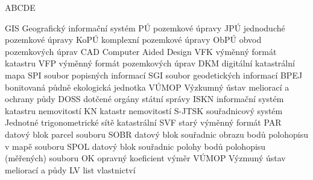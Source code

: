 
\begin{seznamzkratek}{ABCDE}

	      {GIS}
	      {Geografický informační systém}
	      {PÚ}
	      {pozemkové úpravy}
	      {JPÚ}
	      {jednoduché pozemkové úpravy}
	      {KoPÚ}
	      {komplexní pozemkové úpravy}
	      {ObPÚ}
	      {obvod pozemkových úprav}
	      {CAD}
	      {Computer Aided Design}
	      {VFK}
	      {výměnný formát katastru}
	      {VFP}
	      {výměnný formát pozemkových úprav}
	      {DKM}
	      {digitální katastrální mapa}
	      {SPI}
	      {soubor popisných informací}
	      {SGI}
	      {soubor geodetických informací}
	      {BPEJ}
	      {bonitovaná půdně ekologická jednotka}
	      {VÚMOP}
	      {Výzkumný ústav meliorací a ochrany půdy}
	      {DOSS}
	      {dotčené orgány státní správy}
	      {ISKN}
	      {informační systém katastru nemovitostí}
	      {KN}
	      {katastr nemovitostí}
	      {S-JTSK}
	      {souřadnicový systém Jednotné trigonometrické sítě katastrální}
	      {SVF}
	      {starý výměnný formát}
	      {PAR}
	      {datový blok parcel souboru }
	      {SOBR}
	      {datový blok souřadnic obrazu bodů polohopisu v mapě souboru }
	      {SPOL}
	      {datový blok souřadnic polohy bodů polohopisu (měřených) souboru }
	      {OK}
	      {opravný koeficient výměr}
	      {VÚMOP}
	      {Výzmuný ústav meliorací a půdy}
	      {LV}
	      {list vlastnictví}
	      
\end{seznamzkratek}